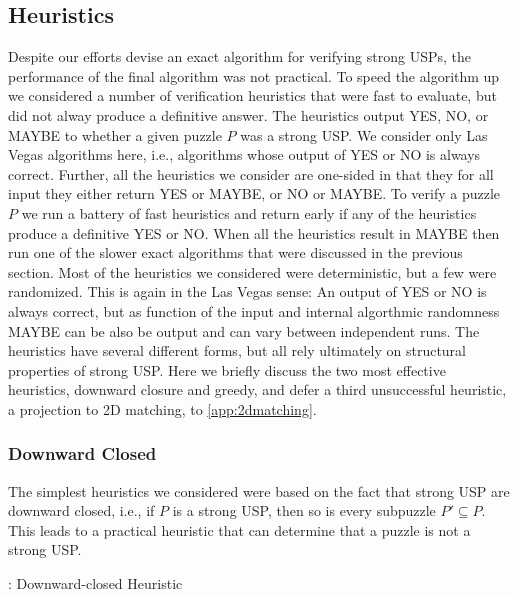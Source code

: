 \documentclass[11pt]{article}
\newcommand\sse{\subseteq}
\begin{document}
\label{subsec:mip}




\subsection{Heuristics}
\label{sec:heuristic}

Despite our efforts devise an exact algorithm for verifying strong
USPs, the performance of the final algorithm was not practical.  To
speed the algorithm up we considered a number of verification
heuristics that were fast to evaluate, but did not alway produce a
definitive answer.  The heuristics output YES, NO, or MAYBE to whether
a given puzzle $P$ was a strong USP.  We consider only Las Vegas
algorithms here, i.e., algorithms whose output of YES or NO is
always correct.  Further, all the heuristics we consider are one-sided
in that they for all input they either return YES or MAYBE, or NO or
MAYBE.  To verify a puzzle $P$ we run a battery of fast heuristics and
return early if any of the heuristics produce a definitive YES or NO.
When all the heuristics result in MAYBE then run one of the slower
exact algorithms that were discussed in the previous section.  Most of
the heuristics we considered were deterministic, but a few were
randomized.  This is again in the Las Vegas sense: An output of YES or
NO is always correct, but as function of the input and internal
algorthmic randomness MAYBE can be also be output and can vary between
independent runs.  The heuristics have several different forms, but
all rely ultimately on structural properties of strong USP.  Here we
briefly discuss the two most effective heuristics, downward closure
and greedy, and defer a third unsuccessful heuristic, a projection to
2D matching, to \autoref{app:2dmatching}.

\subsubsection{Downward Closed}

The simplest heuristics we considered were based on the fact that
strong USP are downward closed, i.e., if $P$ is a strong USP, then
so is every subpuzzle $P' \sse P$.  This leads to a practical heuristic
that can determine that a puzzle is not a strong USP.

\begin{algorithm}[t]
  \caption{: Downward-closed Heuristic}
  \label{alg:downward-closed}
\begin{algorithmic}[1]
  \For{$P' \sse P, |P'| = s'$}
        \EndIf
  \EndFor{}
  \EndFunction
\end{algorithmic}
\end{algorithm}
\end{document}
